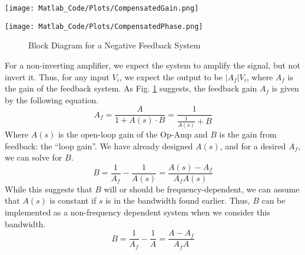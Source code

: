 \documentclass[lettersize,journal]{IEEEtran}
\begin{document}
\begin{figure*}[!t]
  \centering
  \texttt{[image: Matlab\_Code/Plots/CompensatedGain.png]}
  \caption{Bode Plot of Open-Loop Gain After Frequency Compensation} 
  \label{fig:freqcompengainBode}
\end{figure*}

\begin{figure*}[!t]
  \centering
  \texttt{[image: Matlab\_Code/Plots/CompensatedPhase.png]}
  \caption{Bode Plot of Open-Loop Phase After Frequency Compensation} 
  \label{fig:freqcompenphaseBode}
  \hrulefill
\end{figure*}

\begin{figure}[H]
  \centering
  \caption{Block Diagram for a Negative Feedback System}
  \label{fig:blockdiagram}
\end{figure}
For a non-inverting amplifier, we expect the system to amplify the signal, but 
not invert it. Thus, for any input $V_i$, we expect the output to be $\left|A_f\right|V_i$, 
where $A_f$ is the gain of the feedback system. As Fig. \ref{fig:blockdiagram} suggests, the 
feedback gain $A_f$ is given by the following equation.
\begin{equation}
  A_f = \frac{A}{1+A(s)\cdot B} = \frac{1}{\frac{1}{A(s)} + B}
\end{equation}
Where $A(s)$ is the open-loop gain of the Op-Amp and $B$ is the gain from feedback: the 
``loop gain''. We have already designed $A(s)$, and for a desired $A_f$, we can solve 
for $B$.
\begin{equation}
  B = \frac{1}{A_f} - \frac{1}{A(s)} = \frac{A(s) - A_f}{A_fA(s)}
\end{equation}
While this suggests that $B$ will or should be frequency-dependent, we 
can assume that $A(s)$ is constant if $s$ is in the bandwidth found earlier.
Thus, $B$ can be implemented as a non-frequency dependent system when 
we consider this bandwidth.
\begin{equation}
  \label{eq:B_forma}
  B = \frac{1}{A_f} - \frac{1}{A} = \frac{A - A_f}{A_fA}
\end{equation}
\end{document}
